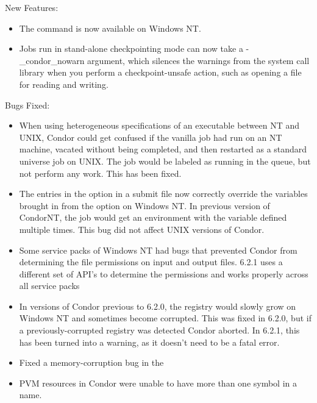 \noindent New Features:

\begin{itemize}

\item The  command is now available on Windows NT.

\item Jobs run in stand-alone checkpointing mode can now take a -\_condor\_nowarn
argument, which silences the warnings from the system call library when you
perform a checkpoint-unsafe action, such as opening a file for reading and
writing.

\end{itemize}

\noindent Bugs Fixed:

\begin{itemize}

\item When using heterogeneous specifications of an executable between
NT and UNIX, Condor could get confused if the vanilla job had run on
an NT machine, vacated without being completed, and then restarted as
a standard universe job on UNIX. The job would be labeled as running in
the queue, but not perform any work. This has been fixed.

\item The entries in the  
option in a submit file now correctly override the variables brought in
from the  option on Windows NT.
In previous version of CondorNT, the job would get an environment with the
variable defined multiple times. This bug did not affect UNIX versions of 
Condor.

\item Some service packs of Windows NT had bugs that prevented Condor
from determining the file permissions on input and output files. 6.2.1
uses a different set of API's to determine the permissions and works 
properly across all service packs

\item In versions of Condor previous to 6.2.0, the registry would slowly
grow on Windows NT and sometimes become corrupted. This was fixed in 6.2.0,
but if a previously-corrupted registry was detected Condor aborted. In 6.2.1,
this has been turned into a warning, as it doesn't need to be a fatal error.

\item Fixed a memory-corruption bug in the 

\item PVM resources in Condor were unable to have more than one
 symbol in a name. 


\end{itemize}
